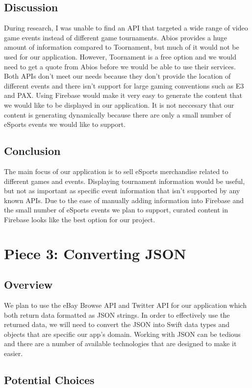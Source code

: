 \documentclass[onecolumn, draftclsnofoot,10pt, compsoc]{IEEEtran}
\begin{document}
\subsection{Discussion}
During research, I was unable to find an API that targeted a wide range of video game events instead of different game tournaments. 
Abios provides a huge amount of information compared to Toornament, but much of it would not be used for our application. 
However, Toornament is a free option and we would need to get a quote from Abios before we would be able to use their services. 
Both APIs don't meet our needs because they don't provide the location of different events and there isn't support for large gaming conventions such as E3 and PAX. 
Using Firebase would make it very easy to generate the content that we would like to be displayed in our application.
It is not neccesary that our content is generating dynamically because there are only a small number of eSports events we would like to support. 
\subsection{Conclusion}
The main focus of our application is to sell eSports merchandise related to different games and events. 
Displaying tournament information would be useful, but not as important as specific event information that isn't supported by any known APIs.
Due to the ease of manually adding information into Firebase and the small number of eSports events we plan to support, curated content in Firebase looks like the best option for our project.  

\section{Piece 3: Converting JSON}
\subsection{Overview}
We plan to use the eBay Browse API and Twitter API for our application which both return data formatted as JSON strings. 
In order to effectively use the returned data, we will need to convert the JSON into Swift data types and objects that are specific our app’s domain.
Working with JSON can be tedious and there are a number of available technologies that are designed to make it easier.
\subsection{Potential Choices}
\end{document}
